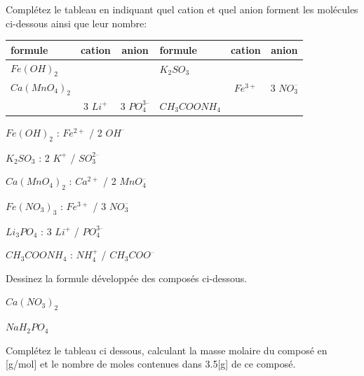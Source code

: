 \documentclass[
  11pt,
  french,
  a4paper,
  openany]{book}
\begin{document}
\newpage

\begin{Exercise}
Complétez le tableau en indiquant quel cation et quel anion forment les molécules ci-dessous ainsi que leur nombre:

\end{Exercise}

\begin{longtable}[]{@{}lcclcc@{}}
\toprule
formule & cation & anion & formule & cation & anion\tabularnewline
\midrule
\endhead
\(Fe(OH)_2\) & & & \(K_2SO_3\) & &\tabularnewline
\(Ca(MnO_4)_2\) & & & & \(Fe^{3+}\) & 3 \(NO_3^–\)\tabularnewline
& 3 \(Li^+\) & 3 \(PO_4^{3–}\) & \(CH_3COONH_4\) & &\tabularnewline
\bottomrule
\end{longtable}

\begin{Answer}

\begin{multicols}{2}
\(Fe(OH)_2\) : \(Fe^{2+}\) / 2 \(OH^–\)

\(K_2SO_3\) : 2 \(K^+\) / \(SO_3^{2–}\)

\(Ca(MnO_4)_2\) : \(Ca^{2+}\) / 2 \(MnO_4^–\)

\(Fe(NO_3)_3\) : \(Fe^{3+}\) / 3 \(NO_3^–\)

\(Li_3PO_4\) : 3 \(Li^+\) / \(PO_4^{3–}\)

\(CH_3COONH_4\) : \(NH_4^+\) / \(CH_3COO^–\)

\end{multicols}

\newpage


\end{Answer}

\begin{Exercise}

Dessinez la formule développée des composés ci-dessous.

\begin{multicols}{2}
\(Ca(NO_3)_2\)

\(NaH_2PO_4\)

\end{multicols}



\end{Exercise}

\begin{Exercise}
Complétez le tableau ci dessous, calculant la masse molaire du composé en {[}g/mol{]} et le nombre de moles contenues dans 3.5{[}g{]} de ce composé.

\end{Exercise}
\end{document}
